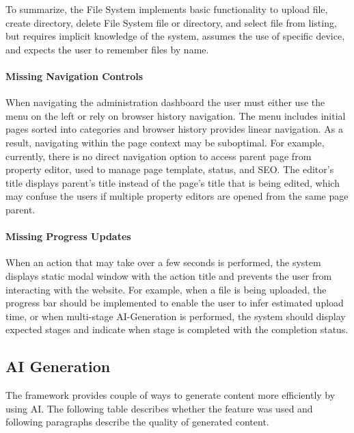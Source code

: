 To summarize, the File System implements basic functionality to upload file, create directory,
delete File System file or directory, and select file from listing, but requires implicit knowledge of the system,
assumes the use of specific device, and expects the user to remember files by name.

\paragraph{Missing Navigation Controls}
When navigating the administration dashboard the user must either use the menu on the left or rely on browser history navigation.
The menu includes initial pages sorted into categories and browser history provides linear navigation.
As a result, navigating within the page context may be suboptimal.
For example, currently, there is no direct navigation option to access parent page from property editor,
used to manage page template, status, and SEO\@.
The editor's title displays parent's title instead of the page's title that is being edited, which may confuse the users
if multiple property editors are opened from the same page parent.

\paragraph{Missing Progress Updates}
When an action that may take over a few seconds is performed, the system displays static modal window with the action title
and prevents the user from interacting with the website.
For example, when a file is being uploaded, the progress bar should be implemented to enable the user to infer
estimated upload time, or when multi-stage AI-Generation is performed, the system should display expected stages
and indicate when stage is completed with the completion status.



\subsection{AI Generation}\label{subsec:ai-generation}
The framework provides couple of ways to generate content more efficiently by using AI\@.
The following table describes whether the feature was used and following paragraphs describe the quality of generated content.

